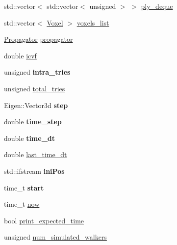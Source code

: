 \begin{DoxyCompactItemize}
\item 
std\+::vector$<$ std\+::vector$<$ unsigned $>$ $>$ \hyperlink{class_dynamics_simulation_ad920a07f2c8c85fab7a1aec983c15b20}{ply\+\_\+deque}
\item 
std\+::vector$<$ \hyperlink{class_voxel}{Voxel} $>$ \hyperlink{class_dynamics_simulation_ab68d71822661c3608bde4553392c9bd1}{voxels\+\_\+list}
\item 
\hyperlink{class_propagator}{Propagator} \hyperlink{class_dynamics_simulation_a62f78ae3e723206d16f1528e344ab1e9}{propagator}
\item 
double \hyperlink{class_dynamics_simulation_ac4161cbca21d20fde85817a21b99bd07}{icvf}
\item 
\mbox{\label{class_dynamics_simulation_ab2eef9ff5ee32531cdf743327cf41455}} 
unsigned {\bfseries intra\+\_\+tries}
\item 
unsigned \hyperlink{class_dynamics_simulation_abb056d8cde70aab8b6fa81ee8cdb231e}{total\+\_\+tries}
\item 
\mbox{\label{class_dynamics_simulation_af7ff1563912461e63693087d7aaf616b}} 
Eigen\+::\+Vector3d {\bfseries step}
\item 
\mbox{\label{class_dynamics_simulation_a854c987e8b1806d74205eb916836befa}} 
double {\bfseries time\+\_\+step}
\item 
\mbox{\label{class_dynamics_simulation_ae79118cbf5ce497cc82c6471353d5045}} 
double {\bfseries time\+\_\+dt}
\item 
double \hyperlink{class_dynamics_simulation_aa73be02bc4cb5027a1bc4a0b6b91b4b2}{last\+\_\+time\+\_\+dt}
\item 
\mbox{\label{class_dynamics_simulation_a5d736b0d739d22d6a2d9371fbcdd8775}} 
std\+::ifstream {\bfseries ini\+Pos}
\item 
\mbox{\label{class_dynamics_simulation_a6fc87bbfea509599236624fda517c901}} 
time\+\_\+t {\bfseries start}
\item 
time\+\_\+t \hyperlink{class_dynamics_simulation_a4e14e7f5efc039772219b00b02381db1}{now}
\item 
bool \hyperlink{class_dynamics_simulation_a8742da6be78261e71b9b8cd4de0df488}{print\+\_\+expected\+\_\+time}
\item 
unsigned \hyperlink{class_dynamics_simulation_a8772d8683d6089eef368212ee99d12d5}{num\+\_\+simulated\+\_\+walkers}
\end{DoxyCompactItemize}



